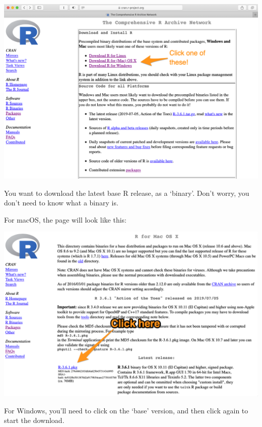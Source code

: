 \documentclass[]{book}
\begin{document}
\includegraphics[width=15.69in]{atlas/r_cran}

You want to download the latest base R release, as a `binary'. Don't worry, you don't need to know what a binary is.

For macOS, the page will look like this:

\includegraphics[width=15.68in]{atlas/r_cran_macos}

For Windows, you'll need to click on the `base' version, and then click again to start the download.
\end{document}
